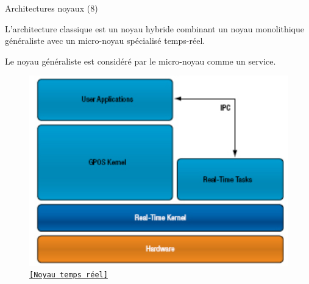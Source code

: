 \documentclass[12pt, t]{beamer}
\newcommand{\src}[2]{\vspace{-10pt}\caption{\href{#1}{\centering \tt \tiny [#2]}}}
\begin{document}
\begin{frame}{Architectures noyaux (8)}

    \vspace{10pt}
    L'architecture classique est un noyau hybride combinant un noyau monolithique
    généraliste avec un micro-noyau spécialisé temps-réel.

    {
        \vspace{10pt}
        Le noyau généraliste est considéré par le micro-noyau comme un service.

        \vspace{10pt}
        \begin{figure}
            \centering
            \includegraphics[scale=0.3]{rt.png}
            \src{http://www.rtcmagazine.com/articles/view/101091}{Noyau temps réel}
        \end{figure}
    }

\end{frame}
\end{document}
